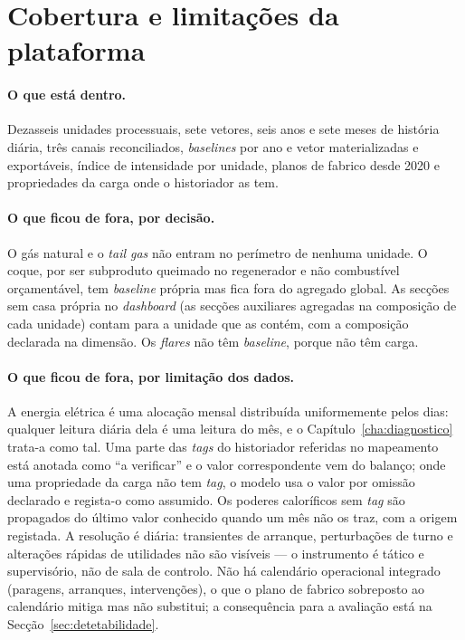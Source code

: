 \section{Cobertura e limitações da plataforma}
\label{sec:cobertura}

\paragraph{O que está dentro.} Dezasseis unidades processuais, sete
vetores, seis anos e sete meses de história diária, três canais
reconciliados, \emph{baselines} por ano e vetor materializadas e
exportáveis, índice de intensidade por unidade, planos de fabrico desde
2020 e propriedades da carga onde o historiador as tem.

\paragraph{O que ficou de fora, por decisão.} O gás natural e o
\emph{tail gas} não entram no perímetro de nenhuma unidade. O coque, por
ser subproduto queimado no regenerador e não combustível orçamentável,
tem \emph{baseline} própria mas fica fora do agregado global. As secções
sem casa própria no \emph{dashboard} (as secções auxiliares agregadas na
composição de cada unidade) contam para a unidade que as contém, com a
composição declarada na dimensão. Os \emph{flares} não têm
\emph{baseline}, porque não têm carga.

\paragraph{O que ficou de fora, por limitação dos dados.} A energia
elétrica é uma alocação mensal distribuída uniformemente pelos dias:
qualquer leitura diária dela é uma leitura do mês, e o
Capítulo~\ref{cha:diagnostico} trata-a como tal. Uma parte das
\emph{tags} do historiador referidas no mapeamento está anotada como ``a
verificar'' e o valor correspondente vem do balanço; onde uma
propriedade da carga não tem \emph{tag}, o modelo usa o valor por omissão
declarado e regista-o como assumido. Os poderes caloríficos sem
\emph{tag} são propagados do último valor conhecido quando um mês não os
traz, com a origem registada. A resolução é diária: transientes de
arranque, perturbações de turno e alterações rápidas de utilidades não
são visíveis --- o instrumento é tático e supervisório, não de sala de
controlo. Não há calendário operacional integrado (paragens, arranques,
intervenções), o que o plano de fabrico sobreposto ao calendário mitiga
mas não substitui; a consequência para a avaliação está na
Secção~\ref{sec:detetabilidade}.


